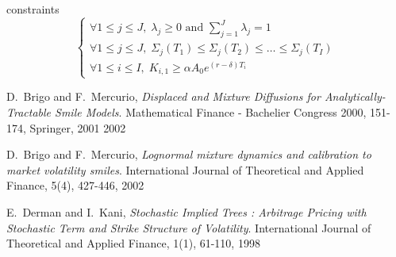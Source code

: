 \documentclass[11pt]{article}
\begin{document}
  constraints
\begin{equation*}
   \begin{cases}
      \forall 1\leq j\leq J,\;\lambda_j\geq 0\mbox{ and
      }\sum_{j=1}^J\lambda_j=1\\
\forall 1\leq j\leq J,\;\Sigma_j(T_1)\leq \Sigma_j(T_2)\leq\hdots \leq
      \Sigma_j(T_I)\\
\forall 1\leq i\leq I,\;K_{i,1}\geq \alpha A_0e^{(r-\delta)T_i}
   \end{cases}
\end{equation*}
\begin{thebibliography}{1}
D.~Brigo and F.~Mercurio,
\emph{Displaced and Mixture Diffusions for Analytically-Tractable Smile Models}.
Mathematical Finance - Bachelier Congress 2000, 151-174, Springer, 2001
2002

D.~Brigo and F.~Mercurio,
\emph{Lognormal mixture dynamics and calibration to market volatility smiles}.
International Journal of Theoretical and Applied Finance, 5(4), 427-446, 2002

E.~Derman and I.~Kani,
\emph{Stochastic Implied Trees : Arbitrage Pricing with Stochastic Term
  and Strike Structure of Volatility}.
International Journal of Theoretical and Applied Finance, 1(1), 61-110, 1998\end{thebibliography}
\end{document}
